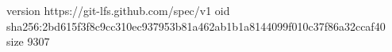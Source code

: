 version https://git-lfs.github.com/spec/v1
oid sha256:2bd615f3f8c9cc310ec937953b81a462ab1b1a8144099f010c37f86a32ccaf40
size 9307
